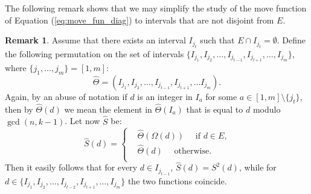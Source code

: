 \documentclass{amsart}
\theoremstyle{definition}
\newtheorem{rem}[prop]{Remark}
\numberwithin{equation}{section}
\begin{document}
The following remark shows that we may simplify the study of the move function of Equation (\ref{eq:move_fun_diag}) to intervals that are not disjoint from $E$.
\begin{rem} \label{rem:intervals}
Assume that there exists an interval $I_{j_t}$ such that $E \cap I_{j_t} = \emptyset$. Define  the following permutation on the set of intervals $\{I_{j_1},I_{j_2},\dotsc,I_{j_{t-1}},I_{j_{t+1}},\dotsc, I_{j_m}\}$, where $\{j_1,\dotsc, j_m\} = [1,m]$:
\[
\hat{\Theta} = (I_{j_1},I_{j_2},\dotsc,I_{j_{t-1}},I_{j_{t+1}},\dotsc I_{j_m}).
\]
Again, by an abuse of notation if $d$ is an integer in $I_{a}$ for some $a \in [1,m]\setminus\{j_t\}$, then by $\hat{\Theta}(d)$ we mean the element in $\hat{\Theta}(I_{{a}})$ that is equal to $d$ modulo $\gcd(n,k-1)$. Let now $\widehat{S}$ be:
\begin{equation} \label{eq:s_hat}
\widehat{S}(d)= \left\{ 
\begin{aligned}
&\hat{\Theta}(\Omega(d)) \quad\text{ if $d \in E$,} \\
&\hat{\Theta}(d) \quad\text{ otherwise.} \\
\end{aligned}
\right. 
\end{equation}
 Then it easily follows that for every $d \in I_{j_{t-1}}$, $\widehat{S}(d) = S^2(d)$, while for $d \in \{I_{j_1},I_{j_2},\dotsc,I_{j_{t-2}},I_{j_{t+1}},\dotsc, I_{j_m}\}$ the two functions coincide. 
\end{rem}
\end{document}
